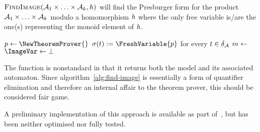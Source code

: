   \begin{algorithm}
    \DontPrintSemicolon
    \caption{$\textsc{FindImage}{}(\mathcal{A}_1 \times \ldots \times \mathcal{A}_k, h)$ will find the Presburger form for the product $\mathcal{A}_1 \times \ldots \times \mathcal{A}_k$ modulo a homomorphism $h$ where the only free variable is/are the one(s) representing the monoid element of $h$.}\label{alg:find-image}
  
$p \gets \NewTheoremProver{}$\;
$\Filter(\Transition) := \FreshVariable{p}$ for every $t \in \delta_{\mathcal{A}}$\;
$m \gets$ \;
\;
$\ImageVar \gets \bot$\;
    \KwRet{\ImageVar}
    \end{algorithm}

    The \GetModel{} function is nonstandard in that it returns both the model
    and its associated automaton. Since algorithm~\ref{alg:find-image} is
    essentially a form of quantifier elimination and therefore an internal affair
    to the theorem prover, this should be considered fair game.
    
    A preliminary implementation of this approach is available as part
    of~\Catra, but has been neither optimised nor fully tested.
\fi